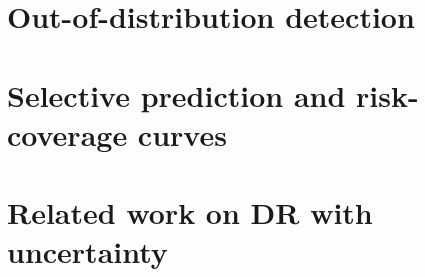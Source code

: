 \section{Out-of-distribution detection}

\section{Selective prediction and risk-coverage curves}

\section{Related work on DR with uncertainty}
